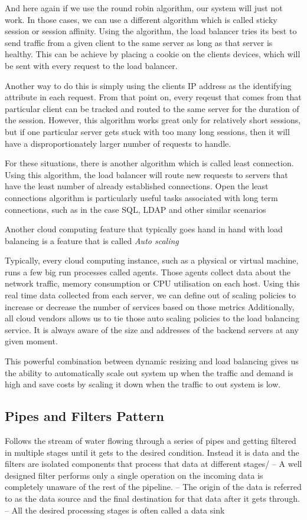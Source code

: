 And here again if we use the round robin algorithm, our system will just not work.
In those cases, we can use a different algorithm which is called sticky session or session affinity.
Using the algorithm, the load balancer tries its best to send traffic from a given client to the same server as long as that server is healthy.
This can be achieve by placing a cookie on the clients devices, which will be sent with every request to the load balancer.

Another way to do this is simply using the clients IP address as the identifying attribute in each request.
From that point on, every reqeust that comes from that particular client can be tracked and routed to the same server for the duration of the session.
However, this algorithm works great only for relatively short sessions, but if one particular server gets stuck with too many long sessions, then it will have a disproportionately larger number of requests to handle.

For these situations, there is another algorithm which is called least connection.
Using this algorithm, the load balancer will route new requests to servers that have the least number of already established connections.
Open the least connections algorithm is particularly useful tasks associated with long term connections, such as in the case SQL, LDAP and other similar scenarios

Another cloud computing feature that typically goes hand in hand with load balancing is a feature that is called \textit{Auto scaling}

Typically, every cloud computing instance, such as a physical or virtual machine, runs a few big run processes called agents.
Those agents collect data about the network traffic, memory consumption or CPU utilisation on each host.
Using this real time data collected from each server, we can define out of scaling policies to increase or decrease the number of services based on those metrics
Additionally, all cloud vendors allows us to tie those auto scaling policies to the load balancing service.
It is always aware of the size and addresses of the backend servers at any given moment.

This powerful combination between dynamic resizing and load balancing gives us the ability to automatically scale out system up when the traffic and demand is high and save costs by scaling it down when the traffic to out system is low.

\subsection{Pipes and Filters Pattern}
Follows the stream of water flowing through a series of pipes and getting filtered in multiple stages until it gets to the desired condition.
Instead it is data and the filters are isolated components that process that data at different stages/
-- A well designed filter performs only a single operation on the incoming data is completely unaware of the rest of the pipeline.
-- The origin of the data is referred to as the data source and the final destination for that data after it gets through.
-- All the desired processing stages is often called a data sink

